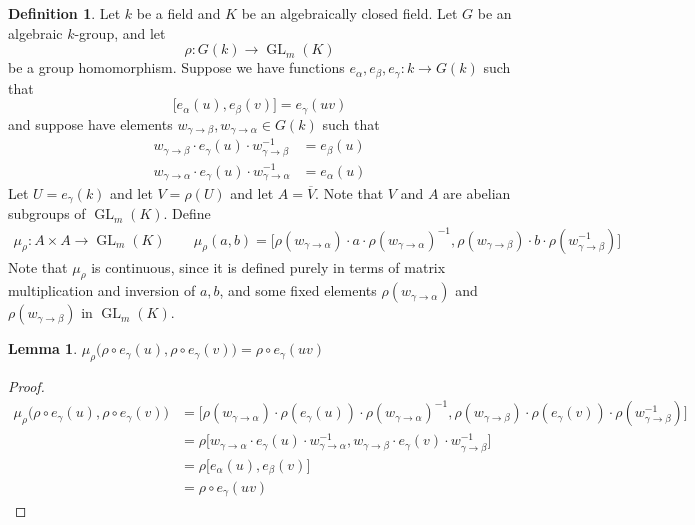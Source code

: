 \documentclass[12pt]{article}
\newtheorem{lemma}{Lemma}
\theoremstyle{definition}
\newtheorem{definition}{Definition}
\newcommand{\inv}{^{-1}}
\newcommand{\ov}{\overline}
\DeclareMathOperator{\GL}{GL}
\begin{document}
\begin{definition}
Let $k$ be a field and $K$ be an algebraically closed field. Let $G$ be an algebraic $k$-group, and let
\[
	\rho:G(k) \to \GL_m(K)
\]
be a group homomorphism. Suppose we have functions $e_\alpha, e_\beta, e_\gamma:k \to G(k)$ such that
\[
	\Big[ e_\alpha(u),  e_\beta(v) \Big] = e_\gamma(uv)
\]
and suppose have elements $w_{\gamma \to \beta}, w_{\gamma \to \alpha} \in G(k)$ such that
\begin{align*}
	w_{\gamma \to \beta} \cdot e_\gamma (u) \cdot w_{\gamma \to \beta} \inv &= e_\beta (u) \\
	w_{\gamma \to \alpha} \cdot e_\gamma (u) \cdot w_{\gamma \to \alpha} \inv &= e_\alpha (u)
\end{align*}
Let $U = e_\gamma (k)$ and let $V = \rho(U)$ and let $A = \ov{V}$. Note that $V$ and $A$ are abelian subgroups of $\GL_m(K)$. Define
\begin{align*}
	\mu_\rho:A \times A \to \GL_m(K) \qquad
	\mu_\rho(a,b) = \Big[ \rho(w_{\gamma \to \alpha}) \cdot a \cdot \rho(w_{\gamma \to \alpha}) \inv, \rho(w_{\gamma \to \beta}) \cdot b \cdot \rho(w_{\gamma \to \beta} \inv) \Big]
\end{align*}
Note that $\mu_{\rho}$ is continuous, since it is defined purely in terms of matrix multiplication and inversion of $a, b$, and some fixed elements $\rho(w_{\gamma \to \alpha})$ and $\rho(w_{\gamma \to \beta})$ in $\GL_m(K)$. 
\end{definition}

\begin{lemma}
\label{multiplicative}
$\mu_\rho \Big( \rho  \circ e_\gamma(u), \rho \circ e_\gamma(v) \Big) = \rho \circ e_\gamma(uv)$
\end{lemma}
\begin{proof}
\begin{align*}
	\mu_\rho \Big( \rho  \circ e_\gamma(u), \rho \circ e_\gamma(v) \Big) &= \Big[ \rho(w_{\gamma \to \alpha}) \cdot \rho (e_\gamma(u)) \cdot \rho(w_{\gamma \to \alpha}) \inv, \rho(w_{\gamma \to \beta}) \cdot \rho(e_\gamma(v)) \cdot \rho(w_{\gamma \to \beta} \inv) \Big] \\
&= \rho \Big[ w_{\gamma \to \alpha} \cdot e_\gamma(u) \cdot w_{\gamma \to \alpha} \inv, w_{\gamma \to \beta} \cdot e_\gamma(v) \cdot w_{\gamma \to \beta} \inv \Big] \\
&= \rho \Big[ e_\alpha(u), e_\beta(v) \Big] \\
&=  \rho \circ e_\gamma(uv)
\end{align*}
\end{proof}
\end{document}
